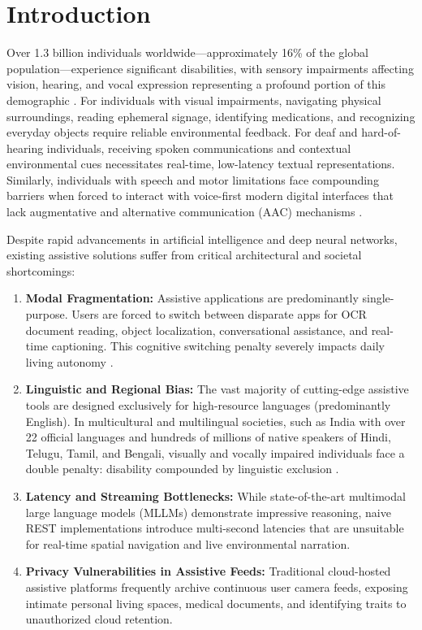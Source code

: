 \documentclass[10pt,a4paper]{article}
\begin{document}
\section{Introduction}

Over 1.3 billion individuals worldwide—approximately 16\% of the global population—experience significant disabilities, with sensory impairments affecting vision, hearing, and vocal expression representing a profound portion of this demographic \citep{who2023disability}. For individuals with visual impairments, navigating physical surroundings, reading ephemeral signage, identifying medications, and recognizing everyday objects require reliable environmental feedback. For deaf and hard-of-hearing individuals, receiving spoken communications and contextual environmental cues necessitates real-time, low-latency textual representations. Similarly, individuals with speech and motor limitations face compounding barriers when forced to interact with voice-first modern digital interfaces that lack augmentative and alternative communication (AAC) mechanisms \citep{bigham2010vizwiz, w3c2023wcag}.

Despite rapid advancements in artificial intelligence and deep neural networks, existing assistive solutions suffer from critical architectural and societal shortcomings:
\begin{enumerate}
    \item \textbf{Modal Fragmentation:} Assistive applications are predominantly single-purpose. Users are forced to switch between disparate apps for OCR document reading, object localization, conversational assistance, and real-time captioning. This cognitive switching penalty severely impacts daily living autonomy \citep{morris2020ai}.
    \item \textbf{Linguistic and Regional Bias:} The vast majority of cutting-edge assistive tools are designed exclusively for high-resource languages (predominantly English). In multicultural and multilingual societies, such as India with over 22 official languages and hundreds of millions of native speakers of Hindi, Telugu, Tamil, and Bengali, visually and vocally impaired individuals face a double penalty: disability compounded by linguistic exclusion \citep{jawahar2021indicnlp}.
    \item \textbf{Latency and Streaming Bottlenecks:} While state-of-the-art multimodal large language models (MLLMs) demonstrate impressive reasoning, naive REST implementations introduce multi-second latencies that are unsuitable for real-time spatial navigation and live environmental narration.
    \item \textbf{Privacy Vulnerabilities in Assistive Feeds:} Traditional cloud-hosted assistive platforms frequently archive continuous user camera feeds, exposing intimate personal living spaces, medical documents, and identifying traits to unauthorized cloud retention.
\end{enumerate}
\end{document}

